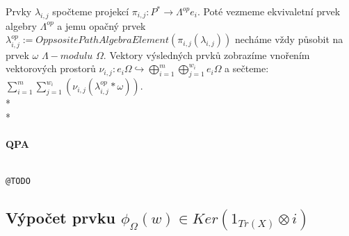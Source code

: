 \documentclass[7pt]{article}
\begin{document}
       Prvky $\lambda_{i,j}$ spočteme projekcí $\pi_{i,j}:P^*\rightarrow \Lambda^{op} 
       e_i$. Poté vezmeme ekvivaletní prvek algebry $\Lambda^{op} $ a jemu 
       opačný prvek $\lambda_{i,j}^{op}:=OppsositePathAlgebraElement(\pi_{i,j}(\lambda_{i,j}))$ 
       necháme vždy působit na prvek $\omega$ $\Lambda-modulu$ $\Omega$. Vektory 
       výsledných prvků zobrazíme vnořením vektorových prostorů 
       $\nu_{i,j}:
       e_i\Omega\hookrightarrow 
       \bigoplus_{i=1}^m\bigoplus_{j=1}^{w_i}e_i\Omega$ a sečteme:        
       $\sum_{i=1}^m\sum_{j=1}^{w_i}(\nu_{i,j}(\lambda_{i,j}^{op}*\omega))$.\\*\\*

         \centerline{}  
                   
      \paragraph{QPA}
        \begin{verbatim}

@TODO
        \end{verbatim}



    \subsection{Výpočet prvku $\phi_\Omega(w) \in Ker(1_{Tr(X)}\otimes i)$}
\end{document}
